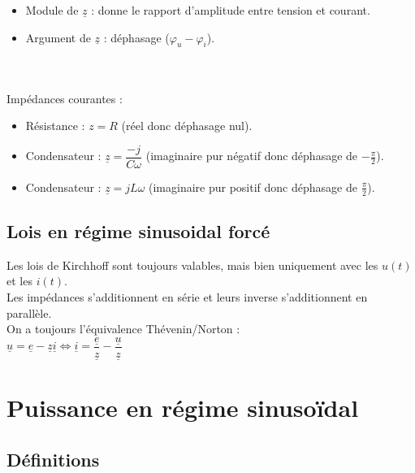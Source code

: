 \documentclass[13pt, twoside, a4paper, french]{report}
\begin{document}
    \begin{itemize}
        \item Module de $\underline{z}$ : donne le rapport d'amplitude entre tension et courant.
        \item Argument de $\underline{z}$ : déphasage ($\varphi_u - \varphi_i$).
    \end{itemize}
    \\ \vspace{7pt}\\
    Impédances courantes :
    \begin{itemize}
        \item Résistance : $z = R$ (réel donc déphasage nul).
        \item Condensateur : $\underline{z} = \dfrac{-j}{C \omega}$ (imaginaire pur négatif donc déphasage de $-\frac{\pi}{2}$).
        \item Condensateur : $\underline{z} = jL \omega$ (imaginaire pur positif donc déphasage de $\frac{\pi}{2}$).
    \end{itemize}


    \section{Lois en régime sinusoidal forcé}\label{sec:lois-en-regime-sinusoidal-force}

    Les lois de Kirchhoff sont toujours valables, mais bien uniquement avec les $u(t)$ et les $i(t)$.\\

    Les impédances s'additionnent en série et leurs inverse s'additionnent en parallèle.\\

    On a toujours l'équivalence Thévenin/Norton :\\
    $\underline{u} = \underline{e} - \underline{z} \underline{i} \iff \underline{i} = \dfrac{\underline{e}}{\underline{z}} - \dfrac{\underline{u}}{\underline{z}}$


    \chapter{Puissance en régime sinusoïdal}\label{ch:puissance-en-regime-sinusoidal}


    \section{Définitions}\label{sec:definitions}
\end{document}
